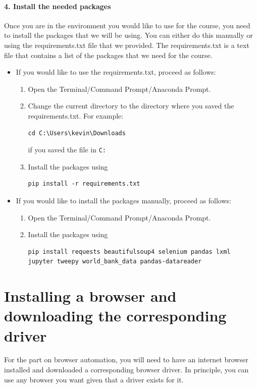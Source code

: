 \documentclass[a4paper]{article}
\begin{document}
\paragraph{4. Install the needed packages} Once you are in the environment you would like to use for the course, you need to install the packages that we will be using. You can either do this manually or using the requirements.txt file that we provided. The requirements.txt is a text file that contains a list of the packages that we need for the course.
\begin{itemize}
	\item If you would like to use the requirements.txt, proceed as follows:
	\begin{enumerate}
		\item Open the Terminal/Command Prompt/Anaconda Prompt.
		\item Change the current directory to the directory where you saved the requirements.txt. For example: 
\begin{verbatim}
cd C:\Users\kevin\Downloads
\end{verbatim} 
if you saved the file in \texttt{C:\Users\kevin\Downloads}
		\item Install the packages using 
\begin{verbatim}
pip install -r requirements.txt
\end{verbatim}
	\end{enumerate}
	\item If you would like to install the packages manually, proceed as follows:
	\begin{enumerate}
		\item Open the Terminal/Command Prompt/Anaconda Prompt.
		\item Install the packages using 
\begin{verbatim}
pip install requests beautifulsoup4 selenium pandas lxml jupyter tweepy world_bank_data pandas-datareader
\end{verbatim}
	\end{enumerate}
\end{itemize}

\section{Installing a browser and downloading the corresponding driver}

For the part on browser automation, you will need to have an internet browser installed and downloaded a corresponding browser driver. In principle, you can use any browser you want given that a driver exists for it.
\end{document}
